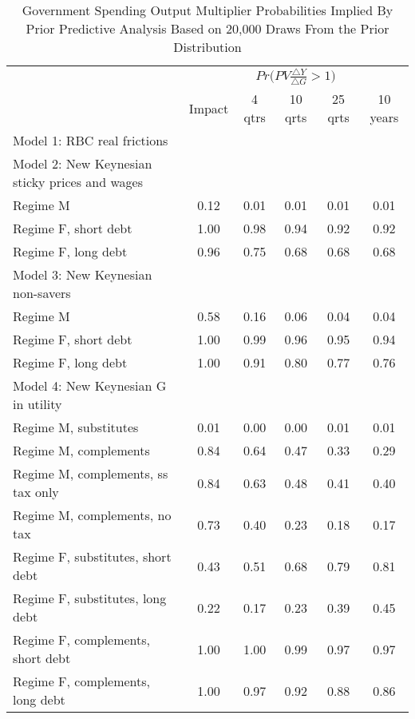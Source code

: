 \documentclass[letterpaper,12pt]{article}%
\begin{document}
\begin{table}[H]
    \centering
    \caption{Government Spending Output Multiplier Probabilities Implied By Prior Predictive Analysis Based on 20,000 Draws From the Prior Distribution}
    \begin{tabular}{l c c c c c}
    \toprule
        & \multicolumn{5}{c}{$Pr\Big(PV \frac{\triangle Y}{\triangle G}>1\Big)$}\\
      \cmidrule{2-6}
        & Impact & 4 qtrs & 10 qrts & 25 qrts & 10 years \\
       \midrule
     Model 1: RBC real frictions &    &   &   &   &  \\
     Model 2: New Keynesian sticky prices and wages  &    &   &   &   &       \\
     \quad Regime M & 0.12 & 0.01 & 0.01 & 0.01 & 0.01  \\
     \quad Regime F, short debt & 1.00 &  0.98  & 0.94 & 0.92  & 0.92  \\
     \quad Regime F, long debt &  0.96 & 0.75 & 0.68 &  0.68  & 0.68  \\
     Model 3: New Keynesian non-savers &    &   &   &   &  \\
     \quad Regime M &   0.58 & 0.16 & 0.06  & 0.04 & 0.04 \\
     \quad Regime F, short debt &  1.00 &  0.99  & 0.96 & 0.95  & 0.94 \\
     \quad Regime F, long debt &   1.00 & 0.91 & 0.80 & 0.77  & 0.76 \\
     Model 4: New Keynesian G in utility &    &   &   &   &  \\
     \quad Regime M, substitutes &   0.01 & 0.00 & 0.00  & 0.01  & 0.01  \\
     \quad Regime M, complements &   0.84 &  0.64 &  0.47  & 0.33  & 0.29  \\
     \quad Regime M, complements, ss tax only &   0.84 & 0.63  & 0.48 & 0.41 & 0.40  \\
     \quad Regime M, complements, no tax &   0.73 &  0.40 & 0.23  & 0.18 & 0.17 \\
     \quad Regime F, substitutes, short debt &  0.43 & 0.51  & 0.68  & 0.79 & 0.81  \\
     \quad Regime F, substitutes, long debt &  0.22  & 0.17  & 0.23 &  0.39  & 0.45 \\
     \quad Regime F, complements, short debt &   1.00 & 1.00 & 0.99 & 0.97 & 0.97  \\
     \quad Regime F, complements, long debt &  1.00 & 0.97  & 0.92 &  0.88 & 0.86  \\

\end{tabular}
\end{table}
\end{document}
